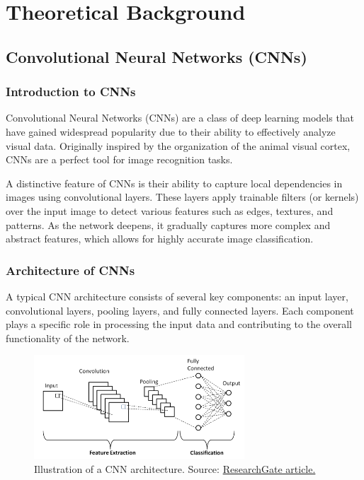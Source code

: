 \chapter{Theoretical Background}

\section{Convolutional Neural Networks (CNNs)}

\subsection{Introduction to CNNs}

Convolutional Neural Networks (CNNs) are a class of deep learning models that have gained widespread popularity due to their ability to effectively analyze visual data. Originally inspired by the organization of the animal visual cortex, CNNs are a perfect tool for image recognition tasks.

A distinctive feature of CNNs is their ability to capture local dependencies in images using convolutional layers. These layers apply trainable filters (or kernels) over the input image to detect various features such as edges, textures, and patterns. As the network deepens, it gradually captures more complex and abstract features, which allows for highly accurate image classification.

\subsection{Architecture of CNNs}

A typical CNN architecture consists of several key components: an input layer, convolutional layers, pooling layers, and fully connected layers. Each component plays a specific role in processing the input data and contributing to the overall functionality of the network.

\begin{figure}[h]
    \centering
    \includegraphics[width=0.7\textwidth]{img/cnn-architecture.png}
    \caption{Illustration of a CNN architecture. Source: \href{https://www.researchgate.net/publication/336805909_A_High-Accuracy_Model_Average_Ensemble_of_Convolutional_Neural_Networks_for_Classification_of_Cloud_Image_Patches_on_Small_Datasets}{ResearchGate article.}}\label{fig:cnn-architecture}
\end{figure}

